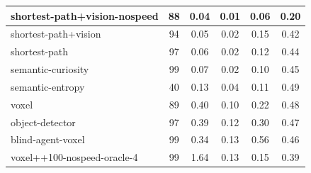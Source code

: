 \begin{table}
\begin{longtable}{|l|c|c|c|c|c|}
shortest-path+vision-nospeed & 88 & {\cellcolor[HTML]{EBF2F0}} \color[HTML]{000000} 0.04 & {\cellcolor[HTML]{EBF2F0}} \color[HTML]{000000} 0.01 & {\cellcolor[HTML]{EBF2F0}} \color[HTML]{000000} 0.06 & 	{\cellcolor[HTML]{55AA99}} \color[HTML]{F1F1F1} 0.20 \\ \hline
shortest-path+vision & 94 & {\cellcolor[HTML]{EBF2F0}} \color[HTML]{000000} 0.05 & {\cellcolor[HTML]{EBF2F0}} \color[HTML]{000000} 0.02 & {\cellcolor[HTML]{EBF2F0}} \color[HTML]{000000} 0.15 & 	{\cellcolor[HTML]{C8E1DC}} \color[HTML]{000000} 0.42 \\ \hline
shortest-path & 97 & {\cellcolor[HTML]{EBF2F0}} \color[HTML]{000000} 0.06 & {\cellcolor[HTML]{EBF2F0}} \color[HTML]{000000} 0.02 & {\cellcolor[HTML]{EBF2F0}} \color[HTML]{000000} 0.12 & 	{\cellcolor[HTML]{CFE5E0}} \color[HTML]{000000} 0.44 \\ \hline
semantic-curiosity & 99 & {\cellcolor[HTML]{EBF2F0}} \color[HTML]{000000} 0.07 & {\cellcolor[HTML]{EBF2F0}} \color[HTML]{000000} 0.02 & {\cellcolor[HTML]{EBF2F0}} \color[HTML]{000000} 0.10 & 	{\cellcolor[HTML]{D6E8E4}} \color[HTML]{000000} 0.45 \\ \hline
semantic-entropy & 40 & {\cellcolor[HTML]{EBF2F0}} \color[HTML]{000000} 0.13 & {\cellcolor[HTML]{EBF2F0}} \color[HTML]{000000} 0.04 & {\cellcolor[HTML]{EBF2F0}} \color[HTML]{000000} 0.11 & 	{\cellcolor[HTML]{EBF2F0}} \color[HTML]{000000} 0.49 \\ \hline
voxel & 89 & {\cellcolor[HTML]{D8E9E5}} \color[HTML]{000000} 0.40 & {\cellcolor[HTML]{EBF2F0}} \color[HTML]{000000} 0.10 & {\cellcolor[HTML]{E0EDEA}} \color[HTML]{000000} 0.22 & 	{\cellcolor[HTML]{E4EFEC}} \color[HTML]{000000} 0.48 \\ \hline
object-detector & 97 & {\cellcolor[HTML]{D9E9E6}} \color[HTML]{000000} 0.39 & {\cellcolor[HTML]{EBF2F0}} \color[HTML]{000000} 0.12 & {\cellcolor[HTML]{D1E6E1}} \color[HTML]{000000} 0.30 & 	{\cellcolor[HTML]{E2EEEB}} \color[HTML]{000000} 0.47 \\ \hline
blind-agent-voxel & 99 & {\cellcolor[HTML]{DDEBE8}} \color[HTML]{000000} 0.34 & {\cellcolor[HTML]{EBF2F0}} \color[HTML]{000000} 0.13 & {\cellcolor[HTML]{A3CFC6}} \color[HTML]{000000} 0.56 & 	{\cellcolor[HTML]{DBEBE7}} \color[HTML]{000000} 0.46 \\ \hline
voxel++100-nospeed-oracle-4 & 99 & {\cellcolor[HTML]{79BBAE}} \color[HTML]{000000} 1.64 & {\cellcolor[HTML]{EBF2F0}} \color[HTML]{000000} 0.13 & {\cellcolor[HTML]{EBF2F0}} \color[HTML]{000000} 0.15 & 	{\cellcolor[HTML]{B6D8D1}} \color[HTML]{000000} 0.39 \\ \hline

\end{longtable}
\end{table}
